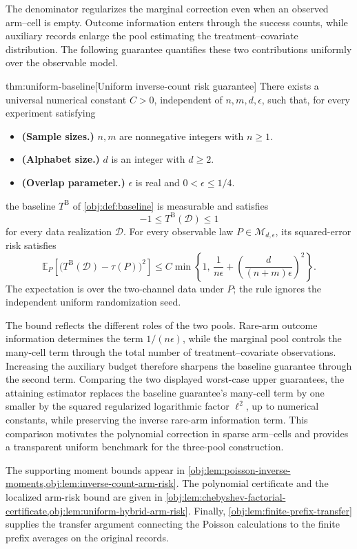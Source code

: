 \documentclass[11pt]{article}
\begin{document}
The denominator regularizes the marginal correction even when an observed arm--cell is empty. Outcome information enters through the success counts, while auxiliary records enlarge the pool estimating the treatment--covariate distribution. The following guarantee quantifies these two contributions uniformly over the observable model.

\begin{theoremv}{thm:uniform-baseline}[Uniform inverse-count risk guarantee]
There exists a universal numerical constant \(C>0\), independent of \(n,m,d,\epsilon\), such that, for every experiment satisfying
\begin{itemize}
\item \textbf{(Sample sizes.)} \(n,m\) are nonnegative integers with \(n\ge 1\).
\item \textbf{(Alphabet size.)} \(d\) is an integer with \(d\ge 2\).
\item \textbf{(Overlap parameter.)} \(\epsilon\) is real and \(0<\epsilon\le 1/4\).
\end{itemize}
the baseline \(T^{\mathrm B}\) of \cref{obj:def:baseline} is measurable and satisfies
\[
-1\le T^{\mathrm B}(\mathcal D)\le 1
\]
for every data realization \(\mathcal D\). For every observable law \(P\in\mathcal M_{d,\epsilon}\), its squared-error risk satisfies
\[
\mathbb E_P\!\left[
  \bigl(T^{\mathrm B}(\mathcal D)-\tau(P)\bigr)^2
\right]
\le
C\min\!\left\{
1,\,
\frac{1}{n\epsilon}
+
\left(\frac{d}{(n+m)\epsilon}\right)^2
\right\}.
\]
The expectation is over the two-channel data under \(P\); the rule ignores the independent uniform randomization seed.
\end{theoremv}

The bound reflects the different roles of the two pools. Rare-arm outcome information determines the term \(1/(n\epsilon)\), while the marginal pool controls the many-cell term through the total number of treatment--covariate observations. Increasing the auxiliary budget therefore sharpens the baseline guarantee through the second term. Comparing the two displayed worst-case upper guarantees, the attaining estimator replaces the baseline guarantee's many-cell term by one smaller by the squared regularized logarithmic factor \(\ell^2\), up to numerical constants, while preserving the inverse rare-arm information term. This comparison motivates the polynomial correction in sparse arm--cells and provides a transparent uniform benchmark for the three-pool construction.

The supporting moment bounds appear in \cref{obj:lem:poisson-inverse-moments,obj:lem:inverse-count-arm-risk}. The polynomial certificate and the localized arm-risk bound are given in \cref{obj:lem:chebyshev-factorial-certificate,obj:lem:uniform-hybrid-arm-risk}. Finally, \cref{obj:lem:finite-prefix-transfer} supplies the transfer argument connecting the Poisson calculations to the finite prefix averages on the original records.
\end{document}
